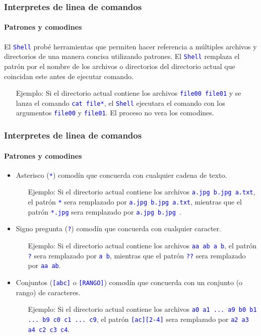 \documentclass[11pt,a4paper,spanish]{beamer}
\newcommand{\cw}[1]{\mbox{\texttt{\textcolor{blue}{#1}}}}
\begin{document}
\begin{frame}

    \frametitle{Interpretes de linea de comandos}
    \framesubtitle{Patrones y comodines}

    El \cw{Shell} probé herramientas que permiten hacer referencia a
    múltiples archivos y directorios de una manera concisa utilizando
    patrones. El \cw{Shell} remplaza el patrón por el nombre de los
    archivos o directorios del directorio actual que coincidan este antes de
    ejecutar comando.

    \begin{itemize}
        \item[Ejemplo:] Si el directorio actual contiene los archivos
            \cw{file00 file01} y se lanza el comando
            \cw{cat file*}, el \cw{Shell} ejecutara el comando con
            los argumentos \cw{file00} y \cw{file01}. El proceso
            no vera los comodines.
    \end{itemize}

\end{frame}

\begin{frame}

    \frametitle{Interpretes de linea de comandos}
    \framesubtitle{Patrones y comodines}

    \begin{itemize}
        \item Asterisco (\cw{*}) comodín que concuerda con cualquier
            cadena de texto.
        \begin{itemize}
            \item[Ejemplo:] Si el directorio actual contiene los archivos
                \cw{a.jpg b.jpg a.txt}, el patrón \cw{*} sera
                remplazado por \cw{a.jpg b.jpg a.txt}, mientras que el
                patrón \cw{*.jpg} sera remplazado por \cw{a.jpg
                b.jpg }.\pause
        \end{itemize}
        \item Signo pregunta (\cw{?}) comodín que concuerda con
            cualquier caracter.
        \begin{itemize}
            \item[Ejemplo:] Si el directorio actual contiene los archivos
                \cw{aa ab a b}, el patrón \cw{?} sera remplazado
                por \cw{a b}, mientras que el patrón \cw{??} sera
                remplazado por \cw{aa ab}.\pause
        \end{itemize}
        \item Conjuntos (\cw{[abc]} o \cw{[RANGO]}) comodín que
            concuerda con un conjunto (o rango) de caracteres.
        \begin{itemize}
            \item[Ejemplo:] Si el directorio actual contiene los archivos
                \cw{a0 a1 ... a9 b0 b1 ... b9 c0 c1 ... c9}, el patrón
                \cw{[ac][2-4]} sera remplazado por \cw{a2 a3 a4 c2
                c3 c4}.
        \end{itemize}
    \end{itemize}

\end{frame}
\end{document}
